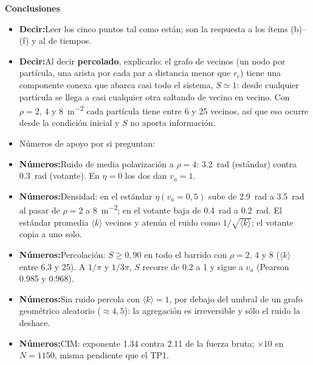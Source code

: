 \documentclass[10pt,a4paper]{article}
\newcommand{\va}{\ensuremath{v_a}}
\newcommand{\diapo}[3]{%
    \needspace{5\baselineskip}%
    \vspace{0.7em}%
    \noindent\colorbox{azul}{\makebox[2.1em]{\color{white}\bfseries\small #1}}%
    \colorbox{grisclaro}{\makebox[\dimexpr\linewidth-2.1em-4\fboxsep\relax][l]{%
        \color{azul}\bfseries\small\hspace{0.4em}#2\hfill
        {\color{gris}\mdseries #3}\hspace{0.4em}}}%
    \par\vspace{0.35em}}
\newcommand{\decir}{\textbf{\color{azul}Decir:}\;}
\newcommand{\nums}{\textbf{\color{acento}Números:}\;}
\newenvironment{notas}
    {\begin{itemize}[leftmargin=1.1em,itemsep=0.15em,topsep=0.15em,parsep=0pt]}
    {\end{itemize}}
\begin{document}
\vspace{0.7em}
{\large\bfseries\color{azul} Conclusiones}
\vspace{-0.2em}

\diapo{31}{Conclusiones}{\SI{60}{s}}
\begin{notas}
    \item \decir Leer los cinco puntos tal como están; son la respuesta a los
          ítems (b)--(f) y al de tiempos.
    \item \decir Al decir \textbf{percolado}, explicarlo: el grafo de vecinos
          (un nodo por partícula, una arista por cada par a distancia menor
          que $r_c$) tiene una componente conexa que abarca casi todo el
          sistema, $S \simeq 1$: desde cualquier partícula se llega a casi
          cualquier otra saltando de vecino en vecino. Con $\rho = 2$, 4 y
          \SI{8}{m^{-2}} cada partícula tiene entre 6 y 25 vecinos, así que
          eso ocurre desde la condición inicial y $S$ no aporta información.
    \item Números de apoyo por si preguntan:
    \item \nums Ruido de media polarización a $\rho = 4$: \SI{3.2}{rad}
          (estándar) contra \SI{0.3}{rad} (votante). En $\eta = 0$ los dos dan
          $\va = 1$.
    \item \nums Densidad: en el estándar $\eta(\va = 0{,}5)$ sube de
          \SI{2.9}{rad} a \SI{3.5}{rad} al pasar de $\rho = 2$ a
          \SI{8}{m^{-2}}; en el votante baja de \SI{0.4}{rad} a \SI{0.2}{rad}.
          El estándar promedia $\langle k\rangle$ vecinos y atenúa el ruido
          como $1/\sqrt{\langle k\rangle}$; el votante copia a uno solo.
    \item \nums Percolación: $S \ge 0{,}90$ en todo el barrido con $\rho = 2$,
          4 y 8 ($\langle k\rangle$ entre \num{6.3} y \num{25}). A $1/\pi$ y
          $1/3\pi$, $S$ recorre de \num{0.2} a 1 y sigue a \va{} (Pearson
          \num{0.985} y \num{0.968}).
    \item \nums Sin ruido percola con $\langle k\rangle = 1$, por debajo del
          umbral de un grafo geométrico aleatorio ($\approx 4{,}5$): la
          agregación es irreversible y sólo el ruido la deshace.
    \item \nums CIM: exponente \num{1.34} contra \num{2.11} de la fuerza
          bruta; $\times\num{10}$ en $N = 1150$, misma pendiente que el TP1.
\end{notas}
\end{document}
